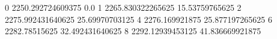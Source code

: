 0 2250.292724609375 0.0
1 2265.830322265625 15.53759765625
2 2275.992431640625 25.69970703125
4 2276.169921875 25.877197265625
6 2282.78515625 32.492431640625
8 2292.12939453125 41.836669921875
